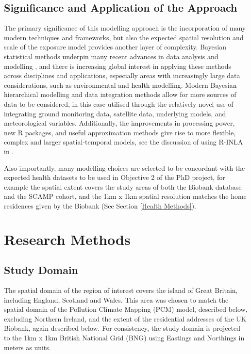 \subsection{Significance and Application of the Approach}
The primary significance of this modelling approach is the incorporation of many modern techniques and frameworks, but also the expected spatial resolution and scale of the exposure model provides another layer of complexity. Bayesian statistical methods underpin many recent advances in data analysis and modelling \citep{vandeSchoot2021BayesianModelling}, and there is increasing global interest in applying these methods across disciplines and applications, especially areas with increasingly large data considerations, such as environmental and health modelling. Modern Bayesian hierarchical modelling and data integration methods allow for more sources of data to be considered, in this case utilised through the relatively novel use of integrating ground monitoring data, satellite data, underlying models, and meteorological variables. Additionally, the improvements in processing power, new R packages, and useful approximation methods give rise to more flexible, complex and larger spatial-temporal models, see the discussion of using R-INLA in \cite{Bakka2018SpatialReview}.

Also importantly, many modelling choices are selected to be concordant with the expected health datasets to be used in Objective 2 of the PhD project, for example the spatial extent covers the study areas of both the Biobank database and the SCAMP cohort, and the 1km x 1km spatial resolution matches the home residences given by the Biobank (See Section \ref{Health Methods}).



\section{Research Methods}
\label{ch:methods}

\subsection{Study Domain}
The spatial domain of the region of interest covers the island of Great Britain, including England, Scotland and Wales. This area was chosen to match the spatial domain of the Pollution Climate Mapping (PCM) model, described below, excluding Northern Ireland, and the extent of the residential addresses of the UK Biobank, again described below. For consistency, the study domain is projected to the 1km x 1km British National Grid (BNG) using Eastings and Northings in meters as units. 

